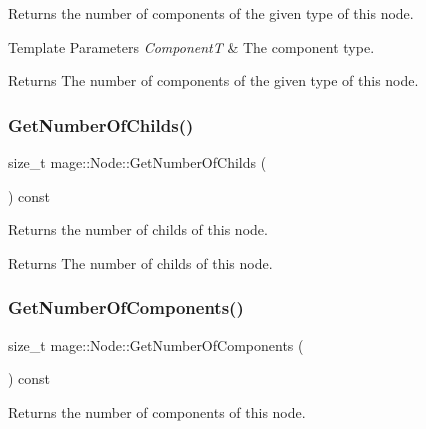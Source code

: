 Returns the number of components of the given type of this node.


\begin{DoxyTemplParams}{Template Parameters}
{\em ComponentT} & The component type. \\
\hline
\end{DoxyTemplParams}
\begin{DoxyReturn}{Returns}
The number of components of the given type of this node. 
\end{DoxyReturn}
\mbox{\label{classmage_1_1_node_a975d92d3d93fe00d748c341198ddf02c}} 
\subsubsection{\texorpdfstring{Get\+Number\+Of\+Childs()}{GetNumberOfChilds()}}
{\footnotesize\ttfamily size\+\_\+t mage\+::\+Node\+::\+Get\+Number\+Of\+Childs (\begin{DoxyParamCaption}{ }\end{DoxyParamCaption}) const\hspace{0.3cm}{\ttfamily [noexcept]}}

Returns the number of childs of this node.

\begin{DoxyReturn}{Returns}
The number of childs of this node. 
\end{DoxyReturn}
\mbox{\label{classmage_1_1_node_a51d74c74f31d8fcbc0cf6768fd180a8e}} 
\subsubsection{\texorpdfstring{Get\+Number\+Of\+Components()}{GetNumberOfComponents()}}
{\footnotesize\ttfamily size\+\_\+t mage\+::\+Node\+::\+Get\+Number\+Of\+Components (\begin{DoxyParamCaption}{ }\end{DoxyParamCaption}) const\hspace{0.3cm}{\ttfamily [noexcept]}}

Returns the number of components of this node.

